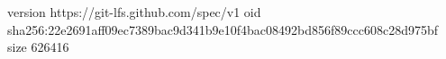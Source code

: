 version https://git-lfs.github.com/spec/v1
oid sha256:22e2691aff09ec7389bac9d341b9e10f4bac08492bd856f89ccc608c28d975bf
size 626416

